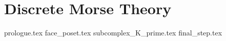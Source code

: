 \documentclass[class=article, crop=false]{standalone}
\begin{document}
\chapter{Discrete Morse Theory}
\label{chap:dmt}

{prologue.tex}
{face_poset.tex}
{subcomplex_K_prime.tex}
{final_step.tex}
\end{document}
